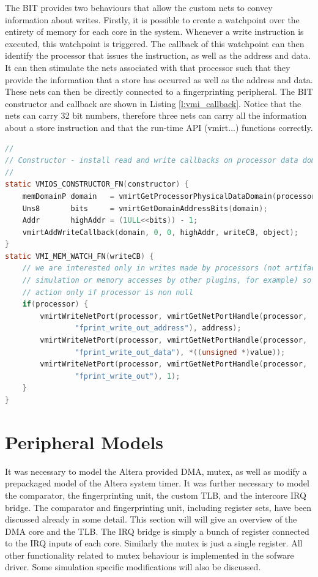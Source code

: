 The BIT provides two behaviours that allow the custom nets to convey information about writes. Firstly, it is possible to create a watchpoint over the entirety of memory for each core in the system. Whenever a write instruction is executed, this watchpoint is triggered. The callback of this watchpoint can then identify the processor that issues the instruction, as well as the address and data. It can then stimulate the nets associated with that processor such that they provide the information that a store has occurred as well as the address and data. These nets can then be directly connected to a fingerprinting peripheral. The BIT constructor and callback are shown in Listing \ref{l:vmi_callback}. Notice that the nets can carry 32 bit numbers, therefore three nets can carry all the information about a store instruction and that the run-time API (vmirt...) functions correctly.

\begin{lstlisting}[frame=single,language=C,label=l:vmi_callback,caption=VMI Memory watchpoint constructor and callback.]
//
// Constructor - install read and write callbacks on processor data domain
//
static VMIOS_CONSTRUCTOR_FN(constructor) {
    memDomainP domain   = vmirtGetProcessorPhysicalDataDomain(processor);
    Uns8       bits     = vmirtGetDomainAddressBits(domain);
    Addr       highAddr = (1ULL<<bits)) - 1;
    vmirtAddWriteCallback(domain, 0, 0, highAddr, writeCB, object);
}
static VMI_MEM_WATCH_FN(writeCB) {
    // we are interested only in writes made by processors (not artifacts of
    // simulation or memory accesses by other plugins, for example) so take
    // action only if processor is non null
    if(processor) {
        vmirtWriteNetPort(processor, vmirtGetNetPortHandle(processor, 
                "fprint_write_out_address"), address);
        vmirtWriteNetPort(processor, vmirtGetNetPortHandle(processor, 
                "fprint_write_out_data"), *((unsigned *)value));
        vmirtWriteNetPort(processor, vmirtGetNetPortHandle(processor, 
                "fprint_write_out"), 1);
    }
}
\end{lstlisting}

\section{Peripheral Models}
It was necessary to model the Altera provided DMA, mutex, as well as modify a prepackaged model of the Altera system timer. It was further necessary to model the comparator, the fingerprinting unit, the custom TLB, and the intercore IRQ bridge. The comparator and fingerprinting unit, including register sets, have been discussed already in some detail. This section will will give an overview of the DMA core and the TLB. The IRQ bridge is simply a bunch of register connected to the IRQ inputs of each core. Similarly the mutex is just a single register. All other functionality related to mutex behaviour is implemented in the sofware driver. Some simulation specific modifications will also be discussed.

